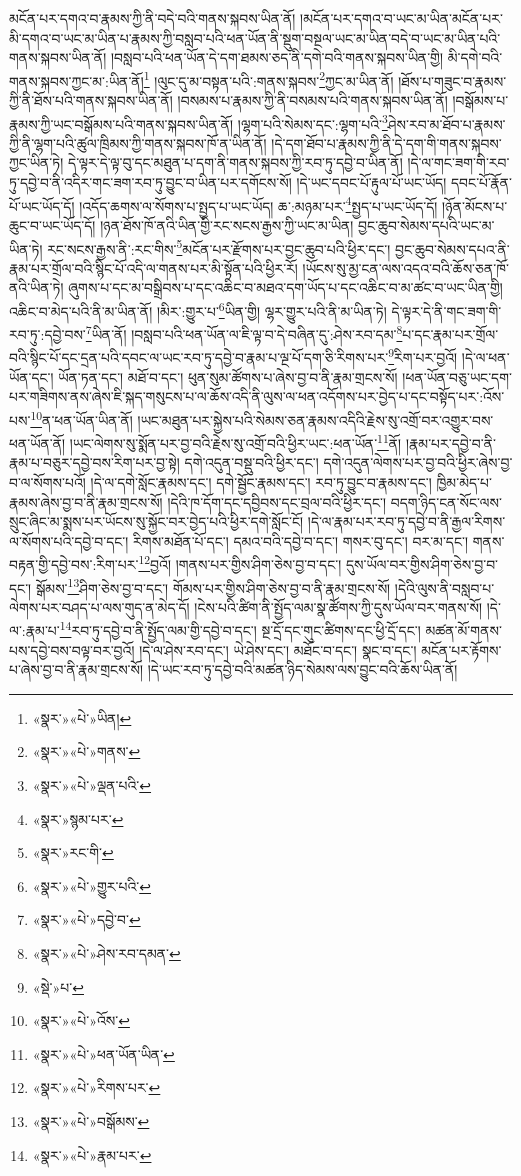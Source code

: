མངོན་པར་དགའ་བ་རྣམས་ཀྱི་ནི་བདེ་བའི་གནས་སྐབས་ཡིན་ནོ། །མངོན་པར་དགའ་བ་ཡང་མ་ཡིན་མངོན་པར་མི་དགའ་བ་ཡང་མ་ཡིན་པ་རྣམས་ཀྱི་བསླབ་པའི་ཕན་ཡོན་ནི་སྡུག་བསྔལ་ཡང་མ་ཡིན་བདེ་བ་ཡང་མ་ཡིན་པའི་གནས་སྐབས་ཡིན་ནོ། །བསླབ་པའི་ཕན་ཡོན་དེ་དག་ཐམས་ཅད་ནི་དགེ་བའི་གནས་སྐབས་ཡིན་གྱི། མི་དགེ་བའི་གནས་སྐབས་ཀྱང་མ་:ཡིན་ནོ།\footnote{«སྣར་»«པེ་»ཡིན།} །ལུང་དུ་མ་བསྟན་པའི་:གནས་སྐབས་\footnote{«སྣར་»«པེ་»གནས་}ཀྱང་མ་ཡིན་ནོ། །ཐོས་པ་གཟུང་བ་རྣམས་ཀྱི་ནི་ཐོས་པའི་གནས་སྐབས་ཡིན་ནོ། །བསམས་པ་རྣམས་ཀྱི་ནི་བསམས་པའི་གནས་སྐབས་ཡིན་ནོ། །བསྒོམས་པ་རྣམས་ཀྱི་ཡང་བསྒོམས་པའི་གནས་སྐབས་ཡིན་ནོ། །ལྷག་པའི་སེམས་དང་:ལྷག་པའི་\footnote{«སྣར་»«པེ་»ལྡན་པའི་}ཤེས་རབ་མ་ཐོབ་པ་རྣམས་ཀྱི་ནི་ལྷག་པའི་ཚུལ་ཁྲིམས་ཀྱི་གནས་སྐབས་ཁོ་ན་ཡིན་ནོ། །དེ་དག་ཐོབ་པ་རྣམས་ཀྱི་ནི་དེ་དག་གི་གནས་སྐབས་ཀྱང་ཡིན་ཏེ། དེ་ལྟར་དེ་ལྟ་བུ་དང་མཐུན་པ་དག་ནི་གནས་སྐབས་ཀྱི་རབ་ཏུ་དབྱེ་བ་ཡིན་ནོ། །དེ་ལ་གང་ཟག་གི་རབ་ཏུ་དབྱེ་བ་ནི་འདིར་གང་ཟག་རབ་ཏུ་བྱུང་བ་ཡིན་པར་དགོངས་སོ། །དེ་ཡང་དབང་པོ་རྟུལ་པོ་ཡང་ཡོད། དབང་པོ་རྣོན་པོ་ཡང་ཡོད་དོ། །འདོད་ཆགས་ལ་སོགས་པ་སྤྱད་པ་ཡང་ཡོད། ཆ་:མཉམ་པར་\footnote{«སྣར་»སྙམ་པར་}སྤྱད་པ་ཡང་ཡོད་དོ། །ཉོན་མོངས་པ་ཆུང་བ་ཡང་ཡོད་དོ། །ཉན་ཐོས་ཁོ་ནའི་ཡིན་གྱི་རང་སངས་རྒྱས་ཀྱི་ཡང་མ་ཡིན། བྱང་ཆུབ་སེམས་དཔའི་ཡང་མ་ཡིན་ཏེ། རང་སངས་རྒྱས་ནི་:རང་གིས་\footnote{«སྣར་»རང་གི་}མངོན་པར་རྫོགས་པར་བྱང་ཆུབ་པའི་ཕྱིར་དང་། བྱང་ཆུབ་སེམས་དཔའ་ནི་རྣམ་པར་གྲོལ་བའི་སྙིང་པོ་འདི་ལ་གནས་པར་མི་སྟོན་པའི་ཕྱིར་རོ། །ཡོངས་སུ་མྱ་ངན་ལས་འདའ་བའི་ཆོས་ཅན་ཁོ་ནའི་ཡིན་ཏེ། ཞུགས་པ་དང་མ་བསྒྲིབས་པ་དང་འཆིང་བ་མཐའ་དག་ཡོད་པ་དང་འཆིང་བ་མ་ཚང་བ་ཡང་ཡིན་གྱི། འཆིང་བ་མེད་པའི་ནི་མ་ཡིན་ནོ། །མིར་:གྱུར་པ་\footnote{«སྣར་»«པེ་»གྱུར་པའི་}ཡིན་གྱི། ལྷར་གྱུར་པའི་ནི་མ་ཡིན་ཏེ། དེ་ལྟར་དེ་ནི་གང་ཟག་གི་རབ་ཏུ་:དབྱེ་བས་\footnote{«སྣར་»«པེ་»དབྱེ་བ་}ཡིན་ནོ། །བསླབ་པའི་ཕན་ཡོན་ལ་ཇི་ལྟ་བ་དེ་བཞིན་དུ་:ཤེས་རབ་དམ་\footnote{«སྣར་»«པེ་»ཤེས་རབ་དམན་}པ་དང་རྣམ་པར་གྲོལ་བའི་སྙིང་པོ་དང་དྲན་པའི་དབང་ལ་ཡང་རབ་ཏུ་དབྱེ་བ་རྣམ་པ་ལྔ་པོ་དག་ཅི་རིགས་པར་\footnote{«སྡེ་»པ་}རིག་པར་བྱའོ། །དེ་ལ་ཕན་ཡོན་དང་། ཡོན་ཏན་དང་། མཐོ་བ་དང་། ཕུན་སུམ་ཚོགས་པ་ཞེས་བྱ་བ་ནི་རྣམ་གྲངས་སོ། །ཕན་ཡོན་བཅུ་ཡང་དག་པར་གཟིགས་ནས་ཞེས་ཇི་སྐད་གསུངས་པ་ལ་ཆོས་འདི་ནི་ལུས་ལ་ཕན་འདོགས་པར་བྱེད་པ་དང་བསྟོད་པར་:འོས་པས་\footnote{«སྣར་»«པེ་»འོས་}ན་ཕན་ཡོན་ཡིན་ནོ། །ཡང་མཐུན་པར་སྐྱེས་པའི་སེམས་ཅན་རྣམས་འདིའི་རྗེས་སུ་འགྲོ་བར་འགྱུར་བས་ཕན་ཡོན་ནོ། །ཡང་ལེགས་སུ་སྨོན་པར་བྱ་བའི་རྗེས་སུ་འགྲོ་བའི་ཕྱིར་ཡང་:ཕན་ཡོན་\footnote{«སྣར་»«པེ་»ཕན་ཡོན་ཡིན་}ནོ། །རྣམ་པར་དབྱེ་བ་ནི་རྣམ་པ་བཅུར་དབྱེ་བས་རིག་པར་བྱ་སྟེ། དགེ་འདུན་བསྡུ་བའི་ཕྱིར་དང་། དགེ་འདུན་ལེགས་པར་བྱ་བའི་ཕྱིར་ཞེས་བྱ་བ་ལ་སོགས་པའོ། །དེ་ལ་དགེ་སློང་རྣམས་དང་། དགེ་སྦྱོང་རྣམས་དང་། རབ་ཏུ་བྱུང་བ་རྣམས་དང་། ཁྱིམ་མེད་པ་རྣམས་ཞེས་བྱ་བ་ནི་རྣམ་གྲངས་སོ། །དེའི་ཁ་དོག་དང་དབྱིབས་དང་བྲལ་བའི་ཕྱིར་དང་། བདག་ཉིད་ངན་སོང་ལས་སྲུང་ཞིང་མ་སྨས་པར་ཡོངས་སུ་སྐྱོང་བར་བྱེད་པའི་ཕྱིར་དགེ་སློང་ངོ། །དེ་ལ་རྣམ་པར་རབ་ཏུ་དབྱེ་བ་ནི་རྒྱལ་རིགས་ལ་སོགས་པའི་དབྱེ་བ་དང་། རིགས་མཐོན་པོ་དང་། དམའ་བའི་དབྱེ་བ་དང་། གསར་བུ་དང་། བར་མ་དང་། གནས་བརྟན་གྱི་དབྱེ་བས་:རིག་པར་\footnote{«སྣར་»«པེ་»རིགས་པར་}བྱའོ། །གནས་པར་གྱིས་ཤིག་ཅེས་བྱ་བ་དང་། དུས་ཡོལ་བར་གྱིས་ཤིག་ཅེས་བྱ་བ་དང་། སྒོམས་\footnote{«སྣར་»«པེ་»བསྒོམས་}ཤིག་ཅེས་བྱ་བ་དང་། གོམས་པར་གྱིས་ཤིག་ཅེས་བྱ་བ་ནི་རྣམ་གྲངས་སོ། །དེའི་ལུས་ནི་བསླབ་པ་ལེགས་པར་བཤད་པ་ལས་གུད་ན་མེད་དོ། །ངེས་པའི་ཚིག་ནི་སྤྱོད་ལམ་སྣ་ཚོགས་ཀྱི་དུས་ཡོལ་བར་གནས་སོ། །དེ་ལ་:རྣམ་པ་\footnote{«སྣར་»«པེ་»རྣམ་པར་}རབ་ཏུ་དབྱེ་བ་ནི་སྤྱོད་ལམ་གྱི་དབྱེ་བ་དང་། སྔ་དྲོ་དང་གུང་ཚིགས་དང་ཕྱི་དྲོ་དང་། མཚན་མོ་གནས་པས་དབྱེ་བས་བལྟ་བར་བྱའོ། །དེ་ལ་ཤེས་རབ་དང་། ཡེ་ཤེས་དང་། མཐོང་བ་དང་། སྣང་བ་དང་། མངོན་པར་རྟོགས་པ་ཞེས་བྱ་བ་ནི་རྣམ་གྲངས་སོ། །དེ་ཡང་རབ་ཏུ་དབྱེ་བའི་མཚན་ཉིད་སེམས་ལས་བྱུང་བའི་ཆོས་ཡིན་ནོ། 